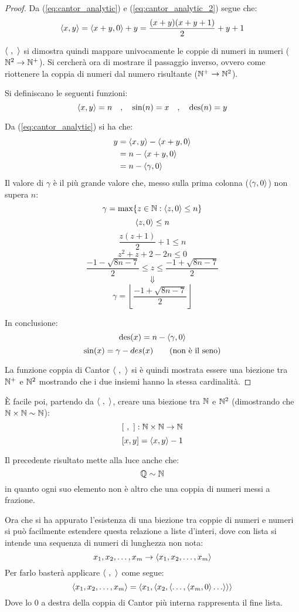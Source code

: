 \begin{proof}
    Da (\ref{eq:cantor_analytic}) e (\ref{eq:cantor_analytic_2}) segue che:
    $$ \langle x,y\rangle = \langle x+y,0\rangle+y = \frac{(x+y)(x+y+1)}{2}+y+1 $$
    
    $\cantor{\ ,\ }$ si dimostra quindi mappare univocamente le coppie di numeri
    in numeri ($\mathbb{N}^2\rightarrow\mathbb{N}^+$). Si cercherà ora di mostrare il passaggio inverso, 
    ovvero come riottenere la coppia di numeri dal numero risultante
    ($\mathbb{N}^+\rightarrow\mathbb{N}^2$).

    Si definiscano le seguenti funzioni:
    $$ \langle x,y\rangle = n \quad , \quad \text{sin}(n) = x \quad , \quad \text{des}(n) = y $$

    Da (\ref{eq:cantor_analytic}) si ha che:
    $$ \begin{aligned}
        y &= \langle x,y\rangle-\langle x+y,0\rangle \\
          &= n-\langle x+y,0\rangle \\
          &= n-\langle\gamma,0\rangle \\
    \end{aligned} $$
    Il valore di $\gamma$ è il più grande valore che, messo sulla prima colonna
    ($\langle\gamma,0\rangle$) non supera $n$:
    $$ \gamma = \max\{z\in\mathbb{N}:\langle z,0\rangle\leq n\} $$
    $$ \langle z,0\rangle\leq n $$
    $$ \frac{z(z+1)}{2}+1 \leq n $$
    $$ z^2+z+2-2n\leq 0 $$
    $$ \frac{-1-\sqrt{8n-7}}{2}\leq z \leq \frac{-1+\sqrt{8n-7}}{2} $$
    $$ \Downarrow $$
    $$ \gamma=\left\lfloor\frac{-1+\sqrt{8n-7}}{2}\right\rfloor $$
    
    In conclusione:
    $$ \text{des}(x) = n-\langle\gamma,0\rangle $$
    \begin{equation} \text{sin}(x) = \gamma-des(x) \tag{non è il seno} \end{equation}

    La funzione coppia di Cantor $\cantor{\ ,\ }$ si è quindi mostrata
    essere una biezione tra $\mathbb{N}^+$ e $\mathbb{N}^2$ mostrando che i due insiemi
    hanno la stessa cardinalità.
\end{proof}

È facile poi, partendo da $\cantor{\ ,\ }$, creare una biezione tra $\mathbb{N}$ e $\mathbb{N}^2$
(dimostrando che $\mathbb{N}\times\mathbb{N}\sim\mathbb{N}$):
$$ [\ ,\ ]:\mathbb{N}\times\mathbb{N}\rightarrow\mathbb{N} $$
$$ [x,y] = \langle x,y\rangle-1 $$

Il precedente risultato mette alla luce anche che:
$$ \mathbb{Q}\sim\mathbb{N} $$
in quanto ogni suo elemento non è altro che una coppia di numeri messi
a frazione.

Ora che si ha appurato l'esistenza di una biezione tra coppie di numeri e numeri si può
facilmente estendere questa relazione a liste d'interi, dove con lista si intende una
sequenza di numeri di lunghezza non nota:
$$ x_1,x_2,\dots,x_m \rightarrow \langle x_1,x_2,\dots,x_m\rangle $$
Per farlo basterà applicare $\cantor{\ ,\ }$ come segue:
$$ \cantor{x_1,x_2,\dots,x_m} = 
\cantor{x_1,\cantor{x_2,\cantor{\dots,\cantor{x_m,0}\dots}}} $$
Dove lo 0 a destra della coppia di Cantor più interna rappresenta il fine lista.

